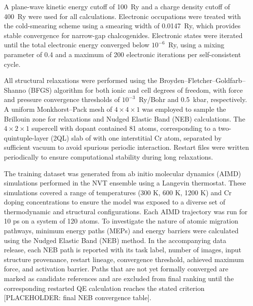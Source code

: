 \documentclass[pdflatex,sn-mathphys-num]{sn-jnl}%
\providecommand{\reviewermap}[3]{}
\theoremstyle{thmstyleone}%
\theoremstyle{thmstyletwo}%
\theoremstyle{thmstylethree}%
\begin{document}
A plane-wave kinetic energy cutoff of 100~Ry and a charge density cutoff of 400~Ry were used for all calculations. Electronic occupations were treated with the cold-smearing scheme using a smearing width of 0.0147~Ry, which provides stable convergence for narrow-gap chalcogenides. Electronic states were iterated until the total electronic energy converged below $10^{-6}$~Ry, using a mixing parameter of 0.4 and a maximum of 200 electronic iterations per self-consistent cycle.

All structural relaxations were performed using the Broyden–Fletcher–Goldfarb–Shanno (BFGS) algorithm for both ionic and cell degrees of freedom, with force and pressure convergence thresholds of $10^{-3}$~Ry/Bohr and 0.5~kbar, respectively. A uniform Monkhorst–Pack mesh of $4 \times 4 \times 1$ was employed to sample the Brillouin zone for relaxations and Nudged Elastic Band (NEB) calculations. The $4 \times 2 \times 1$ supercell with dopant contained 81 atoms, corresponding to a two-quintuple-layer (2QL) slab of  with one interstitial Cr atom, separated by sufficient vacuum to avoid spurious periodic interaction. Restart files were written periodically to ensure computational stability during long relaxations.


\reviewermap{REV-A1}{partial}{DFT NEB references must include per-path convergence status; current path 1-4 reference candidate is 0.336050 eV.}
The training dataset was generated from ab initio molecular dynamics (AIMD) simulations performed in the NVT ensemble using a Langevin thermostat. These simulations covered a range of temperatures (300 K, 600 K, 1200 K) and Cr doping concentrations to ensure the model was exposed to a diverse set of thermodynamic and structural configurations. Each AIMD trajectory was run for 10 ps on a system of 120 atoms. To investigate the nature of atomic migration pathways, minimum energy paths (MEPs) and energy barriers were calculated using the Nudged Elastic Band (NEB) method. In the accompanying data release, each NEB path is reported with its task label, number of images, input structure provenance, restart lineage, convergence threshold, achieved maximum force, and activation barrier. Paths that are not yet formally converged are marked as candidate references and are excluded from final ranking until the corresponding restarted QE calculation reaches the stated criterion [PLACEHOLDER: final NEB convergence table].
\end{document}
